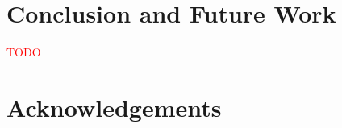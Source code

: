 \documentclass[annual]{acmsiggraph}
\newcommand{\todo}[1]{\textcolor{red}{#1}}
\begin{document}
\section{Conclusion and Future Work}

\todo{TODO}

\section*{Acknowledgements}




\let\otb=\thebibliography
\def\thebibliography#1{\otb{#1}\itemsep-1pt}

\end{document}
